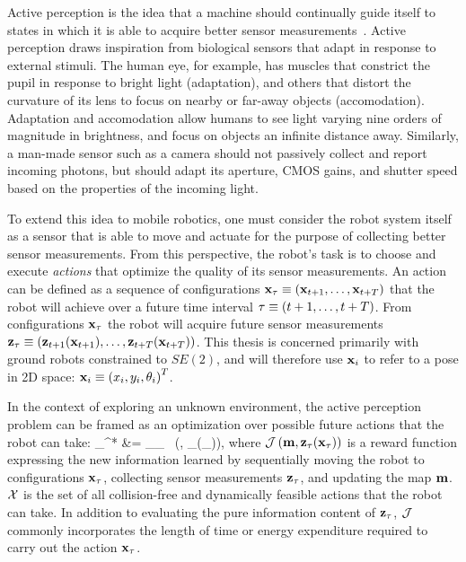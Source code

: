 Active perception is the idea that a machine should continually guide itself to states in
which it is able to acquire better sensor measurements~\cite{bajcsy1988active,bajcsy1992active}.
Active perception draws inspiration from biological sensors that adapt in
response to external stimuli. The human eye, for example, has muscles that
constrict the pupil in response to bright light (adaptation), and others that distort the
curvature of its lens to focus on nearby or far-away objects (accomodation).
Adaptation and accomodation allow humans to see light varying nine orders of
magnitude in brightness, and focus on objects an infinite distance away.
Similarly, a man-made sensor such as a camera should not passively collect and report incoming photons,
but should adapt its aperture, CMOS gains, and shutter speed based on the
properties of the incoming light.

To extend this idea to mobile robotics, one must consider the robot system itself as
a sensor that is able to move and actuate for the purpose of collecting better
sensor measurements. From this perspective, the robot's task is to choose and
execute \textit{actions} that optimize the quality of its sensor measurements.
An action can be defined as a sequence of configurations
$\mathbf{x}_{\mathbf{\tau}}\equiv \left(\mathbf{x}_{t+1}, \dots, \mathbf{x}_{t+T}\right)$
that the robot will achieve
over a future time interval $\mathbf{\tau}\equiv (t+1,\dots,t+T)$. From configurations
$\mathbf{x}_{\mathbf{\tau}}$ the robot will acquire future sensor measurements
$\mathbf{z}_{\mathbf{\tau}} \equiv
\left(\mathbf{z}_{t+1}(\mathbf{x}_{t+1}), \dots, \mathbf{z}_{t+T}(\mathbf{x}_{t+T})\right)$. This thesis is
concerned primarily with ground robots constrained to $SE(2)$, and will
therefore use $\mathbf{x}_{i}$ to refer to a pose in 2D space: $\mathbf{x}_{i}\equiv
\left(x_{i}, y_{i}, \theta_{i}\right)^{T}$.

In the context of exploring an unknown environment, the active perception problem can
be framed as an optimization over possible future actions that the robot can take:
%
\eq
{
  _{\mbf{\tau}}^{*}
  &=
  \argmax_{_{\mbf{\tau}} \in {}}
  \ \left(, _{\mbf{\tau}}(_{\mbf{\tau}})\right),
  \label{eq:active_perception}
}
%
where $\mathcal{J}\left(\mathbf{m}, \mathbf{z}_{\mathbf{\tau}}(\mathbf{x}_{\mathbf{\tau}})\right)$ is a reward
function expressing the new information learned by sequentially moving the robot
to configurations $\mathbf{x}_{\mathbf{\tau}}$, collecting sensor measurements
$\mathbf{z}_{\mathbf{\tau}}$, and updating the map $\mathbf{m}$. $\mathcal{X}$ is the set of all collision-free
and dynamically feasible actions that the robot can take. In addition to
evaluating the pure information content of $\mathbf{z}_{\mathbf{\tau}}$, $\mathcal{J}$ commonly
incorporates the length of time or energy expenditure required to carry out the
action $\mathbf{x}_{\mathbf{\tau}}$.


